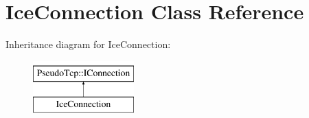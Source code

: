 \hypertarget{classIceConnection}{
\section{IceConnection Class Reference}
\label{classIceConnection}
}
Inheritance diagram for IceConnection:\begin{figure}[H]
\begin{center}
\leavevmode
\includegraphics[height=2cm]{classIceConnection}
\end{center}
\end{figure}
